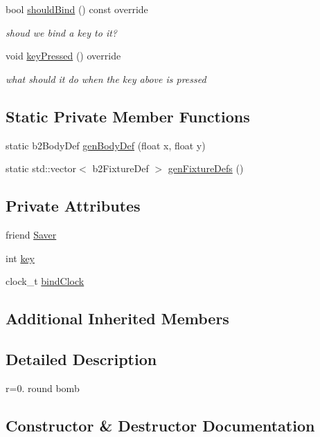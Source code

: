 \begin{DoxyCompactItemize}
bool \hyperlink{classBomb_a3d417c9a938026479149709b76f43b6a}{should\+Bind} () const override
\begin{DoxyCompactList}\small\item\em shoud we bind a key to it? \end{DoxyCompactList}\item 
void \hyperlink{classBomb_a9fe5b989387cc07b82b3da3ccfc3d0db}{key\+Pressed} () override
\begin{DoxyCompactList}\small\item\em what should it do when the key above is pressed \end{DoxyCompactList}\end{DoxyCompactItemize}
\subsection*{Static Private Member Functions}
\begin{DoxyCompactItemize}
\item 
static b2\+Body\+Def \hyperlink{classBomb_ae9ba4f88377f9735543b45267342df11}{gen\+Body\+Def} (float x, float y)
\item 
static std\+::vector$<$ b2\+Fixture\+Def $>$ \hyperlink{classBomb_acd39694e72c15a1553e3045ab1281a51}{gen\+Fixture\+Defs} ()
\end{DoxyCompactItemize}
\subsection*{Private Attributes}
\begin{DoxyCompactItemize}
\item 
friend \hyperlink{classBomb_a658d93baafd7925c4bf86ec9a6888f7a}{Saver}
\item 
int \hyperlink{classBomb_a726b2a3863e21ce6c727755455287ca9}{key}
\item 
clock\+\_\+t \hyperlink{classBomb_afc7bd37fd7d4b6bcb5ddac3deb73321d}{bind\+Clock}
\end{DoxyCompactItemize}
\subsection*{Additional Inherited Members}


\subsection{Detailed Description}
r=0. round bomb 

\subsection{Constructor \& Destructor Documentation}
\hypertarget{classBomb_a99f489e0cc76550410a9cc59aff6a22e}{}
